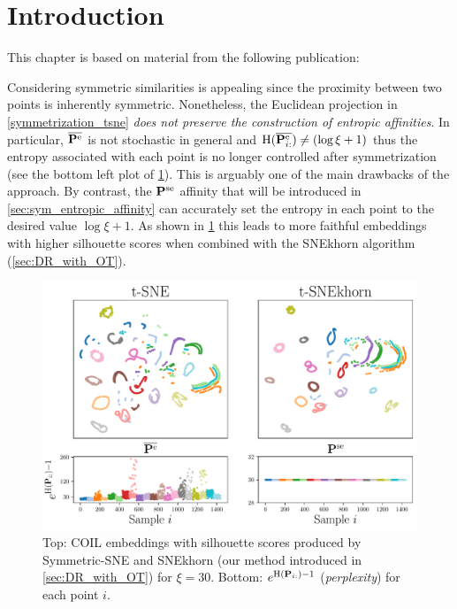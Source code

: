 
\section{Introduction}

This chapter is based on material from the following publication:

\begin{mdframed}
\begin{center} 
\end{center}
\end{mdframed}

Considering symmetric similarities is appealing since the proximity between two
points is inherently symmetric. Nonetheless, the Euclidean projection in
\eqref{symmetrization_tsne} \emph{does not preserve the construction of entropic
affinities}.  In particular, $\overline{\mathbf{P}^{\mathrm{e}}}$ is not stochastic in
general and $\operatorname{H}(\overline{\mathbf{P}_{i:}^{\mathrm{e}}}) \neq (\log{\xi} + 1)$ thus the entropy associated with each point is no longer controlled after symmetrization (see the bottom left plot of \cref{fig:coil}). This is
arguably one of the main drawbacks of the approach. By contrast, the
$\mathbf{P}^{\mathrm{se}}$ affinity that will be introduced in \cref{sec:sym_entropic_affinity} can
accurately set the entropy in each point to the desired value $\log \xi + 1$.  As shown in \cref{fig:coil} this leads to more faithful embeddings with higher silhouette scores when combined with the SNEkhorn algorithm (\cref{sec:DR_with_OT}).

\begin{figure}
    \centering
    \includegraphics[width=0.8\linewidth]{figures/SNEkhorn/fig_coil.pdf}
    \caption{Top: COIL \cite{nene1996columbia} embeddings with silhouette scores produced by Symmetric-SNE and SNEkhorn (our method introduced in  \cref{sec:DR_with_OT}) for $\xi=30$. Bottom: $e^{\operatorname{H}(\mathbf{P}_{i:})-1}$ (\emph{perplexity}) for each point $i$.}
    \label{fig:coil}
\end{figure}

